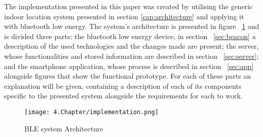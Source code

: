 
\label{cap:implement}


The implementation presented in this paper was created by utilising the generic indoor location system presented in section \ref{cap:architecture} and applying it with bluetooth low energy. The system's architecture is presented in figure ~\ref{fig:implementation} and is divided three parts: the bluetooth low energy device, in section ~\ref{sec:beacon} a description of the used technologies and the changes made are present; the server, whose functionalities and stored information are described in section ~\ref{sec:server}; and the smartphone application, whose process is described in section ~\ref{sec:app} alongside figures that show the functional prototype. For each of these parts an explanation will be given, containing a description of each of its components specific to the presented system alongside the requirements for each to work.


\begin{figure}
	\centering
		\texttt{[image: 4.Chapter/implementation.png]}
	\caption[\ac{BLE} system Architecture]{\ac{BLE} system Architecture}
	\label{fig:implementation}
\end{figure}





\cleardoublepage
